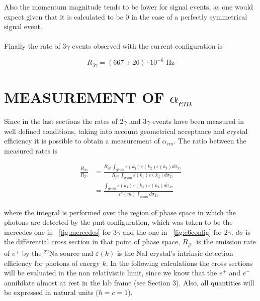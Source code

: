 \documentclass[10pt,a4paper,twocolumn]{article}
\begin{document}
Also the momentum magnitude tends to be lower for signal events, as one would expect given that it is calculated to be 0 in the case of a perfectly symmetrical signal event.
\\
\\
Finally the rate of $3\gamma$ events observed with the current configuration is 

\begin{equation}
    R_{3\gamma}= (667 \pm 26)\cdot 10^{-6} \text{ Hz}
\end{equation}



\section{MEASUREMENT OF $\alpha_{em}$}

Since in the last sections the rates of 2$\gamma$ and 3$\gamma$ events have been measured in well defined conditions, taking into account geometrical acceptance and crystal efficiency it is possible to obtain a measurement of $\alpha_{em}$. The ratio between the measured rates is

\begin{equation}
\label{ratetoalpha}
\begin{split}
    \frac{R_{3 \gamma}}{R_{2\gamma}} & =\frac{R_{\beta^+} \int_{geom}{\varepsilon(k_1) \varepsilon(k_2)\varepsilon(k_3) d\sigma_{3\gamma}}}{R_{\beta^+} \int_{geom}{\varepsilon(k_1) \varepsilon(k_2) d\sigma_{2\gamma}}}\\
    & =\frac{\int_{geom}{\varepsilon(k_1) \varepsilon(k_2)\varepsilon(k_3) d\sigma_{3\gamma}}}{\varepsilon^2(m)\int_{geom}{d\sigma_{2\gamma}}}
    \end{split}
\end{equation}

\noindent where the integral is performed over the region of phase space in which the photons are detected by the pmt configuration, which was taken to be the mercedes one in \figurename~\ref{fig:mercedes} for $3\gamma$ and the one in \figurename~\ref{fig:e6config} for $2\gamma$.  $d\sigma$ is the differential cross section in that point of phase space, $R_{\beta^+}$ is the emission rate of $e^+$ by the $^{22}$Na source and $\varepsilon(k)$ is the NaI crystal's intrinsic detection efficiency for photons of energy $k$. In the following calculations the cross sections will be evaluated in the non relativistic limit, since we know that the $e^+$ and $e^-$ annihilate almost at rest in the lab frame (see Section 3). Also, all quantities will be expressed in natural units ($\hbar=c=1$).
\end{document}
